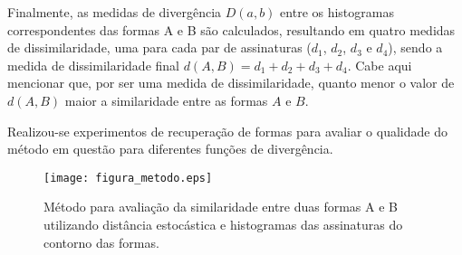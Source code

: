 Finalmente, as medidas de divergência $D(a,b)$ entre os histogramas correspondentes das formas A e B são calculados, resultando em quatro medidas de dissimilaridade, uma para cada par de assinaturas ($d_{1}$, $d_{2}$, $d_{3}$ e $d_{4}$), sendo a medida de dissimilaridade final $d(A,B) = d_{1}+d_{2}+d_{3}+d_{4}$. Cabe aqui mencionar que, por ser uma medida de dissimilaridade, quanto menor o valor de $d(A,B)$ maior a similaridade entre as formas $A$ e $B$. 

Realizou-se experimentos de recuperação de formas para avaliar o qualidade do método em questão para diferentes funções de divergência.



\begin{figure}[h!]
  \caption{\label{fig:metodo_distancia} Método para avaliação da similaridade entre duas formas A e B utilizando distância estocástica e histogramas das assinaturas do contorno das formas.}
  \centering
  \texttt{[image: figura\_metodo.eps]}
\end{figure}


